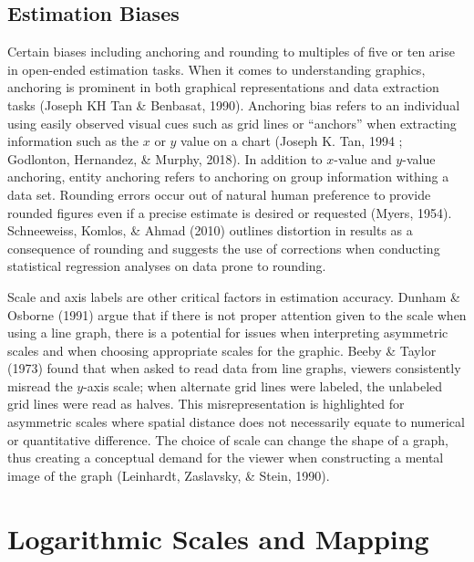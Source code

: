 \documentclass[print]{nuthesis}
\begin{document}
\hypertarget{estimation-biases}{%
\subsection{Estimation Biases}\label{estimation-biases}}

Certain biases including anchoring and rounding to multiples of five or ten arise in open-ended estimation tasks.
When it comes to understanding graphics, anchoring is prominent in both graphical representations and data extraction tasks (Joseph KH Tan \& Benbasat, 1990).
Anchoring bias refers to an individual using easily observed visual cues such as grid lines or ``anchors'' when extracting information such as the \(x\) or \(y\) value on a chart (Joseph K. Tan, 1994 ; Godlonton, Hernandez, \& Murphy, 2018).
In addition to \(x\)-value and \(y\)-value anchoring, entity anchoring refers to anchoring on group information withing a data set.
Rounding errors occur out of natural human preference to provide rounded figures even if a precise estimate is desired or requested (Myers, 1954).
Schneeweiss, Komlos, \& Ahmad (2010) outlines distortion in results as a consequence of rounding and suggests the use of corrections when conducting statistical regression analyses on data prone to rounding.

Scale and axis labels are other critical factors in estimation accuracy.
Dunham \& Osborne (1991) argue that if there is not proper attention given to the scale when using a line graph, there is a potential for issues when interpreting asymmetric scales and when choosing appropriate scales for the graphic.
Beeby \& Taylor (1973) found that when asked to read data from line graphs, viewers consistently misread the \(y\)-axis scale; when alternate grid lines were labeled, the unlabeled grid lines were read as halves.
This misrepresentation is highlighted for asymmetric scales where spatial distance does not necessarily equate to numerical or quantitative difference.
The choice of scale can change the shape of a graph, thus creating a conceptual demand for the viewer when constructing a mental image of the graph (Leinhardt, Zaslavsky, \& Stein, 1990).

\hypertarget{logarithmic-scales-and-mapping}{%
\section{Logarithmic Scales and Mapping}\label{logarithmic-scales-and-mapping}}

\end{document}
